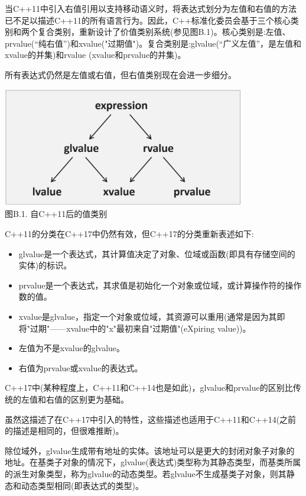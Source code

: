
当C++11中引入右值引用以支持移动语义时，将表达式划分为左值和右值的方法已不足以描述C++11的所有语言行为。因此，C++标准化委员会基于三个核心类别和两个复合类别，重新设计了价值类别系统(参见图B.1)。核心类别是:左值、prvalue(“纯右值”)和xvalue("过期值")。复合类别是:glvalue(“广义左值”，是左值和xvalue的并集)和rvalue (xvalue和prvalue的并集)。

所有表达式仍然是左值或右值，但右值类别现在会进一步细分。

\begin{center}
\includegraphics[width=0.8\textwidth]{content/Appendix/B/images/1.png} \\
图B.1. 自C++11后的值类别
\end{center}

C++11的分类在C++17中仍然有效，但C++17的分类重新表述如下:

\begin{itemize}
\item 
glvalue是一个表达式，其计算值决定了对象、位域或函数(即具有存储空间的实体)的标识。

\item 
prvalue是一个表达式，其求值是初始化一个对象或位域，或计算操作符的操作数的值。

\item 
xvalue是glvalue，指定一个对象或位域，其资源可以重用(通常是因为其即将"过期"——xvalue中的"x"最初来自"过期值"(eXpiring value))。

\item 
左值为不是xvalue的glvalue。

\item 
右值为prvalue或xvalue的表达式。
\end{itemize}

C++17中(某种程度上，C++11和C++14也是如此)，glvalue和prvalue的区别比传统的左值和右值的区别更为基础。

虽然这描述了在C++17中引入的特性，这些描述也适用于C++11和C++14(之前的描述是相同的，但很难推断)。

除位域外，glvalue生成带有地址的实体。该地址可以是更大的封闭对象子对象的地址。在基类子对象的情况下，glvalue(表达式)类型称为其静态类型，而基类所属的派生对象类型，称为glvalue的动态类型。若glvalue不生成基类子对象，则其静态和动态类型相同(即表达式的类型)。

